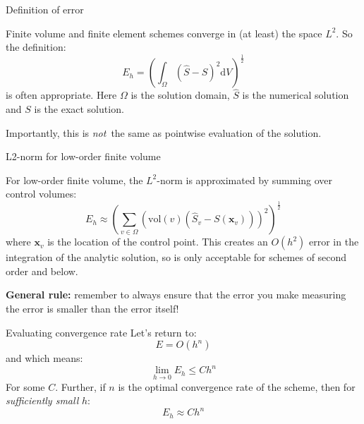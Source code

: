 \documentclass[t]{beamer}
\renewcommand{\vec}[1]{\boldsymbol{#1}}
\begin{document}
\begin{frame}{Definition of error}
  
  Finite volume and finite element schemes converge in (at least) the space
  $L^2$. So the definition:
  \begin{equation}
    E_h = \left(\int_\Omega(\hat{S}-S)^2\mathrm{d}V\right)^{\frac{1}{2}}
  \end{equation}
  is often appropriate. Here $\Omega$ is the solution domain, $\hat{S}$ is
  the numerical solution and $S$ is the exact solution.
  \vfill{}
  
  Importantly, this is \emph{not}\ the same as pointwise evaluation of the
  solution. 

\end{frame}

\begin{frame}{L2-norm for low-order finite volume}
  
  For low-order finite volume, the $L^2$-norm is approximated by summing over
  control volumes:
  \begin{equation}
    E_h \approx \left(\sum_{v\in\Omega}\left(\mathrm{vol}(v)\left(\hat{S}_v - S(\vec{x}_v)\right)\right)^2\right)^{\frac{1}{2}}
  \end{equation}
  where $\vec{x}_v$ is the location of the control point. This creates an
  $O(h^2)$ error in the integration of the analytic solution, so is only
  acceptable for schemes of second order and below.
  \vfill{}

  \textbf{General rule:} remember to always ensure that the error you make
  measuring the error is smaller than the error itself!

\end{frame}

\begin{frame}{Evaluating convergence rate}
  Let's return to:
  \begin{equation}
    E=O(h^n)
  \end{equation}
  and which means:
  \begin{equation}
    \lim_{h\rightarrow 0} E_h\leq Ch^n
  \end{equation}
  For some $C$. \pause Further, if $n$ is the optimal convergence rate of the
  scheme, then for \emph{sufficiently small} $h$:
  \begin{equation}
    E_h\approx Ch^n    
  \end{equation}

\end{frame}
\end{document}
